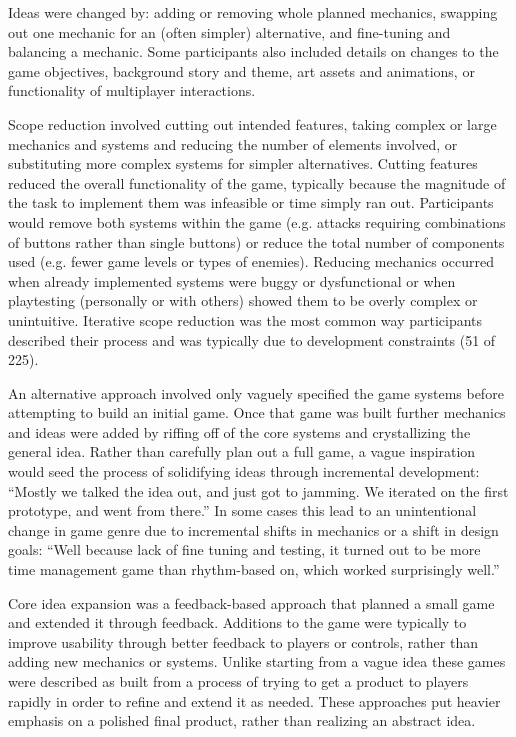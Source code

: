 \documentclass{sig-alternate}
\begin{document}
Ideas were changed by: adding or removing whole planned mechanics, swapping out one mechanic for an (often simpler) alternative, and fine-tuning and balancing a mechanic. Some participants also included details on changes to the game objectives, background story and theme, art assets and animations, or functionality of multiplayer interactions.

Scope reduction involved cutting out intended features, taking complex or large mechanics and systems and reducing the number of elements involved, or substituting more complex systems for simpler alternatives.
Cutting features reduced the overall functionality of the game, typically because the magnitude of the task to implement them was infeasible or time simply ran out. Participants would remove both systems within the game (e.g. attacks requiring combinations of buttons rather than single buttons) or reduce the total number of components used (e.g. fewer game levels or types of enemies).
Reducing mechanics occurred when already implemented systems were buggy or dysfunctional or when playtesting (personally or with others) showed them to be overly complex or unintuitive. 
Iterative scope reduction was the most common way participants described their process and was typically due to development constraints (51 of 225).

An alternative approach involved only vaguely specified the game systems before attempting to build an initial game. Once that game was built further mechanics and ideas were added by riffing off of the core systems and crystallizing the general idea.
Rather than carefully plan out a full game, a vague inspiration would seed the process of solidifying ideas through incremental development: ``Mostly we talked the idea out, and just got to jamming. We iterated on the first prototype, and went from there.''
In some cases this lead to an unintentional change in game genre due to incremental shifts in mechanics or a shift in design goals:
``Well because lack of fine tuning and testing, it turned out to be more time management game than rhythm-based on, which worked surprisingly well.''

Core idea expansion was a feedback-based approach that planned a small game and extended it through feedback. Additions to the game were typically to improve usability through better feedback to players or controls, rather than adding new mechanics or systems. Unlike starting from a vague idea these games were described as built from a process of trying to get a product to players rapidly in order to refine and extend it as needed. These approaches put heavier emphasis on a polished final product, rather than realizing an abstract idea.
\end{document}
